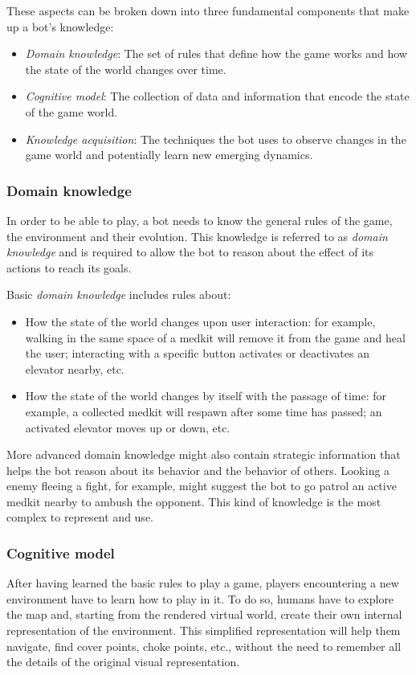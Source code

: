 These aspects can be broken down into three fundamental components that make up a bot's knowledge:
\begin{itemize}
\item \textit{Domain knowledge}: The set of rules that define how the game works and how the state of the world changes over time.
\item \textit{Cognitive model}: The collection of data and information that encode the state of the game world.
\item \textit{Knowledge acquisition}: The techniques the bot uses to observe changes in the game world and potentially learn new emerging dynamics.
\end{itemize}

\subsubsection{Domain knowledge}
In order to be able to play, a bot needs to know the general rules of the game, the environment and their evolution. This knowledge is referred to as \textit{domain knowledge} and is required to allow the bot to reason about the effect of its actions to reach its goals. 

Basic \textit{domain knowledge} includes rules about:
\begin{itemize}
\item How the state of the world changes upon user interaction: for example, walking in the same space of a medkit will remove it from the game and heal the user; interacting with a specific button activates or deactivates an elevator nearby, etc.
\item How the state of the world changes by itself with the passage of time: for example, a collected medkit will respawn after some time has passed; an activated elevator moves up or down, etc.
\end{itemize}

More advanced domain knowledge might also contain strategic information that helps the bot reason about its behavior and the behavior of others. Looking a enemy fleeing a fight, for example, might suggest the bot to go patrol an active medkit nearby to ambush the opponent. This kind of knowledge is the most complex to represent and use.

\subsubsection{Cognitive model}
After having learned the basic rules to play a game, players encountering a new environment have to learn how to play in it. To do so, humans have to explore the map and, starting from the rendered virtual world, create their own internal representation of the environment. This simplified representation will help them navigate, find cover points, choke points, etc., without the need to remember all the details of the original visual representation.

